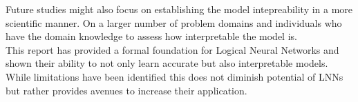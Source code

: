 Future studies might also focus on establishing the model intepreability in a more scientific manner. On a larger number of problem domains and individuals who have the domain knowledge to assess how interpretable the model is.\\

This report has provided a formal foundation for Logical Neural Networks and shown their ability to not only learn accurate but also interpretable models. While limitations have been identified this does not diminish potential of LNNs but rather provides avenues to increase their application.




